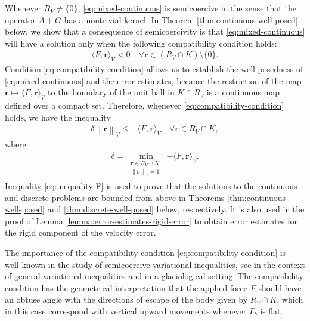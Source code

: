 \documentclass[onefignum,onetabnum]{siamart190516}
\newcommand{\br}{\boldsymbol{r}}
\newcommand{\nrm}[1]{\left\lVert#1\right\rVert}
\begin{document}
Whenever $R_V \neq \{0\}$, \eqref{eq:mixed-continuous} is semicoercive in the sense that the operator $A+G$ has a nontrivial kernel. In Theorem \ref{thm:continuous-well-posed} below, we show that a consequence of semicoercivity is that \eqref{eq:mixed-continuous} will have a solution only when the following compatibility condition holds:
%
\begin{align}\label{eq:compatibility-condition}
	\langle F, \br \rangle_V < 0 \quad \forall \br\in (R_V \cap K) \setminus \{ 0 \}.
\end{align}
%
Condition \eqref{eq:compatibility-condition} allows us to establish the well-posedness of \eqref{eq:mixed-continuous} and the error estimates, because the restriction of the map $\br \mapsto \langle F, \br \rangle_V$ to the boundary of the unit ball in $K\cap R_V$ is a continuous map defined over a compact set. Therefore, whenever \eqref{eq:compatibility-condition} holds, we have the inequality
%
\begin{align}\label{eq:inequality-F}
	\delta\nrm{\br}_V \leq - \langle F, \br \rangle_V \quad \forall \br\in R_V\cap K,
\end{align}
%
where 
%
\begin{align*}
	\delta = \min_{\substack{\br\in R_V\cap K, \\ \nrm{\br}_V = 1}}{- \langle F, \br \rangle_V}.
\end{align*}
%
Inequality \eqref{eq:inequality-F} is used to prove that the solutions to the continuous and discrete problems are bounded from above in Theorems \ref{thm:continuous-well-posed} and \ref{thm:discrete-well-posed} below, respectively. It is also used in the proof of Lemma \ref{lemma:error-estimates-rigid-error} to obtain error estimates for the rigid component of the velocity error.


The importance of the compatibility condition \eqref{eq:compatibility-condition} is well-known in the study of semicoercive variational inequalities, see \cite{hlavacek1978, spann1994, kikuchi1988} in the context of general variational inequalities and \cite{schoof2010,chen2013} in a glaciological setting. The compatibility condition has the geometrical interpretation that the applied force $F$ should have an obtuse angle with the directions of escape of the body given by $R_V \cap K$, which in this case correspond with vertical upward movements whenever $\Gamma_b$ is flat.
\end{document}
